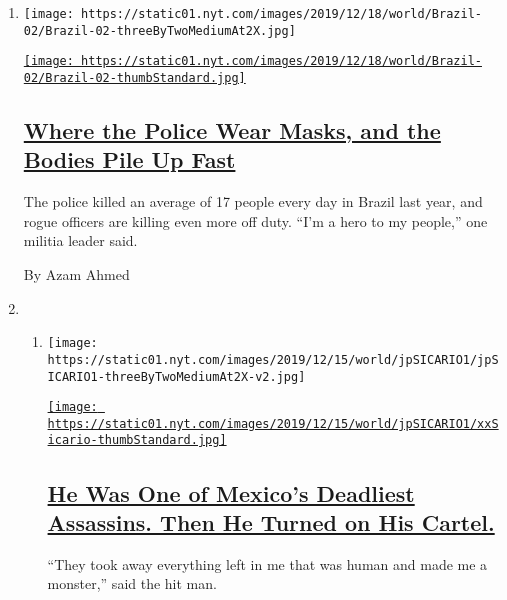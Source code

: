 \begin{enumerate}
\def\labelenumi{\arabic{enumi}.}
\item
  \texttt{[image: https://static01.nyt.com/images/2019/12/18/world/Brazil-02/Brazil-02-threeByTwoMediumAt2X.jpg]}

  \href{/2019/12/20/world/americas/brazil-police-shootings-murder.html}{\texttt{[image: https://static01.nyt.com/images/2019/12/18/world/Brazil-02/Brazil-02-thumbStandard.jpg]}}

  \hypertarget{where-the-police-wear-masks-and-the-bodies-pile-up-fast}{%
  \subsection{\texorpdfstring{\href{/2019/12/20/world/americas/brazil-police-shootings-murder.html}{Where
  the Police Wear Masks, and the Bodies Pile Up
  Fast}}{Where the Police Wear Masks, and the Bodies Pile Up Fast}}\label{where-the-police-wear-masks-and-the-bodies-pile-up-fast}}

  The police killed an average of 17 people every day in Brazil last
  year, and rogue officers are killing even more off duty. ``I'm a hero
  to my people,'' one militia leader said.

  By Azam Ahmed
\item
  \begin{enumerate}
  \def\labelenumii{\arabic{enumii}.}
  \item
    \texttt{[image: https://static01.nyt.com/images/2019/12/15/world/jpSICARIO1/jpSICARIO1-threeByTwoMediumAt2X-v2.jpg]}

    \href{/2019/12/14/world/americas/sicario-mexico-drug-cartels.html}{\texttt{[image: https://static01.nyt.com/images/2019/12/15/world/jpSICARIO1/xxSicario-thumbStandard.jpg]}}

    \hypertarget{he-was-one-of-mexicos-deadliest-assassins-then-he-turned-on-his-cartel}{%
    \subsection{\texorpdfstring{\href{/2019/12/14/world/americas/sicario-mexico-drug-cartels.html}{He
    Was One of Mexico's Deadliest Assassins. Then He Turned on His
    Cartel.}}{He Was One of Mexico's Deadliest Assassins. Then He Turned on His Cartel.}}\label{he-was-one-of-mexicos-deadliest-assassins-then-he-turned-on-his-cartel}}

    ``They took away everything left in me that was human and made me a
    monster,'' said the hit man.


\end{enumerate}
\end{enumerate}
